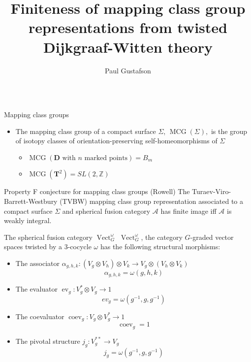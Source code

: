 \documentclass[final,t, mathserif]{beamer}
\title{\huge Finiteness of mapping class group representations from twisted Dijkgraaf-Witten theory }
\author{Paul Gustafson}
\institute{Texas A\&M University}
\DeclareMathOperator{\ev}{ev}
\DeclareMathOperator{\coev}{coev}
\DeclareMathOperator{\MCG}{MCG}
\DeclareMathOperator{\Vect}{Vect}
\theoremstyle{plain}
\theoremstyle{definition}
\begin{document}

\begin{frame}{} 
  \begin{columns}[t]
    
\begin{column}{.3\linewidth}


  \begin{block}{Mapping class groups}

    \begin{itemize}
    
\item
   The mapping class group of a compact surface $\Sigma$, 
   $\MCG(\Sigma),$
   is the group of isotopy classes of orientation-preserving self-homeomorphisms of $\Sigma$ 
  \begin{itemize}
    \item $\MCG(\mathbf{D} \text{ with } n \text{ marked points}) = B_m$
    \item $\MCG(\mathbf{T}^2) = SL(2,\mathbb Z)$
  \end{itemize}
\end{itemize}
\end{block}



\begin{block}{Property F conjecture for mapping class groups (Rowell)}
The Turaev-Viro-Barrett-Westbury (TVBW) mapping class group representation associated to a compact surface $\Sigma$ and spherical fusion category $\mathcal A$ has finite image iff $\mathcal A$ is weakly integral.
\end{block}


\begin{block}{The spherical fusion category $\Vect^\omega_G$}
   $\Vect^\omega_G$, the category $G$-graded vector spaces twisted by a 3-cocycle $\omega$ has the following structural morphisms:
\begin{itemize} 
\item The associator $\alpha_{g,h,k}:(V_g \otimes V_h) \otimes V_k \to V_g \otimes (V_h \otimes V_k)$
            $$ \alpha_{g,h,k} = \omega(g,h,k)$$
\item The evaluator $\ev_g:V_g^* \otimes V_g \to 1$
  $$ ev_g = \omega(g^{-1},g,g^{-1})$$
\item The coevaluator $\coev_g:V_g \otimes V_g^* \to 1$
    $$\coev_g = 1$$
\item The pivotal structure $j_g:V_g^{**} \to V_g$
            $$ j_g = \omega(g^{-1},g,g^{-1})$$
\end{itemize}


\end{block}
\end{column}
\end{columns}
\end{frame}
\end{document}
